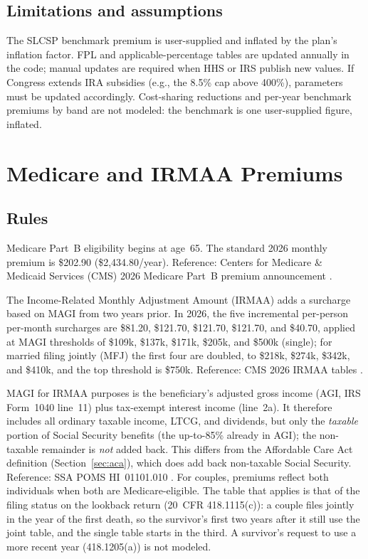 \documentclass[fleqn,12pt]{report}
\begin{document}
\subsection*{Limitations and assumptions}

The SLCSP benchmark premium is user-supplied and inflated by the plan's inflation
factor.
FPL and applicable-percentage tables are updated annually in the code; manual
updates are required when HHS or IRS publish new values.
If Congress extends IRA subsidies (e.g., the 8.5\% cap above 400\%), parameters
must be updated accordingly.
Cost-sharing reductions and per-year benchmark premiums by band are not modeled: the
benchmark is one user-supplied figure, inflated.

\section{Medicare and IRMAA Premiums}

\subsection*{Rules}

Medicare Part~B eligibility begins at age~65.
The standard 2026 monthly premium is \$202.90 (\$2,434.80/year).
Reference: Centers for Medicare \& Medicaid Services (CMS) 2026 Medicare
Part~B premium announcement \cite{cms2026}.

The Income-Related Monthly Adjustment Amount (IRMAA) adds a surcharge based
on MAGI from two years prior.
In 2026, the five incremental per-person per-month surcharges are \$81.20,
\$121.70, \$121.70, \$121.70, and \$40.70, applied at MAGI thresholds of
\$109k, \$137k, \$171k, \$205k, and \$500k (single); for married filing jointly
(MFJ) the first four are doubled, to \$218k, \$274k, \$342k, and \$410k, and the
top threshold is \$750k.
Reference: CMS 2026 IRMAA tables \cite{cms2026}.

MAGI for IRMAA purposes is the beneficiary's adjusted gross income (AGI, IRS
Form~1040 line~11) plus tax-exempt interest income (line~2a). It therefore
includes all ordinary taxable income, LTCG, and dividends, but only the
\emph{taxable} portion of Social Security benefits (the up-to-85\% already in
AGI); the non-taxable remainder is \emph{not} added back. This differs from the
Affordable Care Act definition (Section~\ref{sec:aca}), which does add back
non-taxable Social Security.
Reference: SSA POMS HI~01101.010 \cite{ssa-poms}.
For couples, premiums reflect both individuals when both are Medicare-eligible.
The table that applies is that of the filing status on the lookback return
(20~CFR 418.1115(c)): a couple files jointly in the year of the first death, so the
survivor's first two years after it still use the joint table, and the single
table starts in the third.  A survivor's request to use a more recent year
(418.1205(a)) is not modeled.
\end{document}
